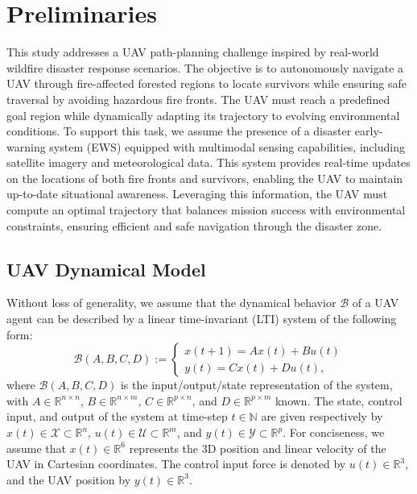 \section{Preliminaries}
\label{sec:Problem}
This study addresses a UAV path-planning challenge inspired by real-world wildfire disaster response scenarios. The objective is to autonomously navigate a UAV through fire-affected forested regions to locate survivors while ensuring safe traversal by avoiding hazardous fire fronts. The UAV must reach a predefined goal region while dynamically adapting its trajectory to evolving environmental conditions.
To support this task, we assume the presence of a disaster early-warning system (EWS) equipped with multimodal sensing capabilities, including satellite imagery and meteorological data. This system provides real-time updates on the locations of both fire fronts and survivors, enabling the UAV to maintain up-to-date situational awareness. Leveraging this information, the UAV must compute an optimal trajectory that balances mission success with environmental constraints, ensuring efficient and safe navigation through the disaster zone.

\subsection{UAV Dynamical Model} 
\label{ssec:agent_dynamics}
Without loss of generality, we assume that the dynamical behavior $\mathscr{B}$ of a UAV agent can be described by a linear time-invariant (LTI) system \cite{how2015linear} of the following form:
\begin{equation} \label{eq:LTI}
\mathscr{B}(A,B,C,D) := 
\begin{cases}
x(t + 1) = Ax(t) + Bu(t) \\
y(t) = Cx(t) + Du(t),
\end{cases}
\end{equation}
where $\mathscr{B}(A,B,C,D)$ is the input/output/state representation of the system, with \( A \in \mathbb{R}^{n \times n} \), \( B \in \mathbb{R}^{n \times m} \), \( C \in \mathbb{R}^{p \times n} \), and \( D \in \mathbb{R}^{p \times m} \)  known. The state, control input, and output of the system at time-step \(t \in \mathbb{N}\) are given respectively by \( x(t) \in \mathcal{X} \subset \mathbb{R}^n \), \( u(t) \in \mathcal{U} \subset \mathbb{R}^m \),  and \( y(t) \in \mathcal{Y} \subset \mathbb{R}^p \). 
For conciseness, we assume that \( x(t) \in \mathbb{R}^6 \) represents the 3D position and linear velocity of the UAV in Cartesian coordinates. The control input force is denoted by \( u(t) \in \mathbb{R}^3 \), and the UAV position by \( y(t) \in \mathbb{R}^3 \).

